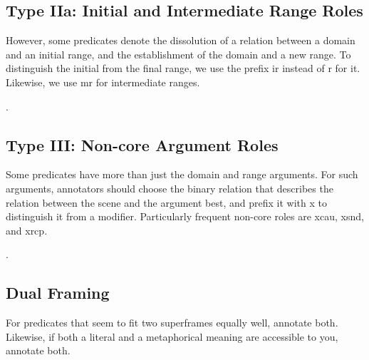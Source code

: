 \documentclass[a4paper]{article}
\begin{document}
\subsection{Type IIa: Initial and Intermediate Range Roles}

However, some predicates denote the dissolution of a relation between a domain and an initial range, and the establishment of the domain and a new range. To distinguish the initial from the final range, we use the prefix \textsf{ir} instead of \textsf{r} for it. Likewise, we use \textsf{mr} for intermediate ranges.

\ex. \\

\subsection{Type III: Non-core Argument Roles}

Some predicates have more than just the domain and range arguments. For such arguments, annotators should choose the binary relation that describes the relation between the scene and the argument best, and prefix it with \textsf{x} to distinguish it from a modifier. Particularly frequent non-core roles are \textsf{xcau}, \textsf{xsnd}, and \textsf{xrcp}.

\ex. 
     \\

\subsection{Dual Framing}

For predicates that seem to fit two superframes equally well, annotate both. Likewise, if both a literal and a metaphorical meaning are accessible to you, annotate both.
\end{document}

